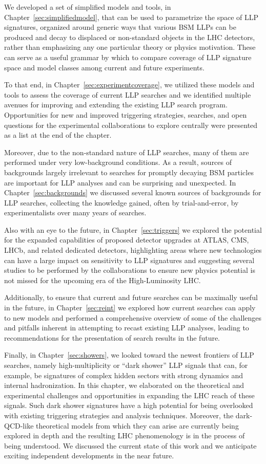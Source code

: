 We developed a set of simplified models and tools, in Chapter~\ref{sec:simplifiedmodel}, that can be used to parametrize the space of LLP signatures, organized around generic ways that various BSM LLPs can be produced and decay to displaced or non-standard objects in the LHC detectors, rather than emphasizing any one particular theory or physics motivation.
These can serve as a useful grammar by which to compare coverage of LLP signature space and model classes among current and future experiments.

To that end, in Chapter~\ref{sec:experimentcoverage}, we utilized these models and tools to assess the coverage of current LLP searches and we identified multiple avenues for improving and extending the existing LLP search program.
Opportunities for new and improved triggering strategies, searches, and open questions for the experimental collaborations to explore centrally were presented as a list at the end of the chapter.

Moreover, due to the non-standard nature of LLP searches, many of them are performed under very low-background conditions.
As a result, sources of backgrounds largely irrelevant to searches for promptly decaying BSM particles are important for LLP analyses and can be surprising and unexpected.
In Chapter~\ref{sec:backgrounds} we discussed several known sources of backgrounds for LLP searches, collecting the knowledge gained, often by trial-and-error, by experimentalists over many years of searches.

Also with an eye to the future, in Chapter~\ref{sec:triggers} we explored the potential for the expanded capabilities of proposed detector upgrades at ATLAS, CMS, LHCb, and related dedicated detectors, highlighting areas where new technologies can have a large impact on sensitivity to LLP signatures and suggesting several studies to be performed by the collaborations to ensure new physics potential is not missed for the upcoming era of the High-Luminosity LHC.

Additionally, to ensure that current and future searches can be maximally useful in the future, in Chapter~\ref{sec:reint} we explored how current searches can apply to new models and performed a comprehensive overview of some of the challenges and pitfalls inherent in attempting to recast existing LLP analyses, leading to recommendations for the presentation of search results in the future.

Finally, in Chapter~\ref{sec:showers}, we looked toward the newest frontiers of LLP searches, namely high-multiplicity or ``dark shower'' LLP signals that can, for example, be signatures of complex hidden sectors with strong dynamics and internal hadronization.
In this chapter, we elaborated on the theoretical and experimental challenges and opportunities in expanding the LHC reach of these signals.
Such dark shower signatures have a high potential for being overlooked with existing triggering strategies and analysis techniques.
Moreover, the dark-QCD-like theoretical models from which they can arise are currently being explored in depth and the resulting LHC phenomenology is in the process of being understood.
We discussed the current state of this work and we anticipate exciting independent developments in the near future.

